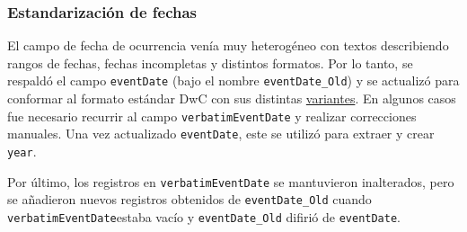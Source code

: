 \documentclass[sn-apa,pdflatex]{sn-jnl}
\begin{document}
\subsubsection{Estandarización de
fechas}\label{estandarizaciuxf3n-de-fechas-1}

El campo de fecha de ocurrencia venía muy heterogéneo con textos
describiendo rangos de fechas, fechas incompletas y distintos formatos.
Por lo tanto, se respaldó el campo \texttt{eventDate} (bajo el nombre
\texttt{eventDate\_Old}) y se actualizó para conformar al formato
estándar DwC con sus distintas
\href{https://techdocs.gbif.org/en/data-processing/temporal-interpretation}{variantes}.
En algunos casos fue necesario recurrir al campo
\texttt{verbatimEventDate} y realizar correcciones manuales. Una vez
actualizado \texttt{eventDate}, este se utilizó para extraer y crear
\texttt{year}.

Por último, los registros en \texttt{verbatimEventDate} se mantuvieron
inalterados, pero se añadieron nuevos registros obtenidos de
\texttt{eventDate\_Old} cuando \texttt{verbatimEventDate}estaba vacío y
\texttt{eventDate\_Old} difirió de \texttt{eventDate}.
\end{document}
